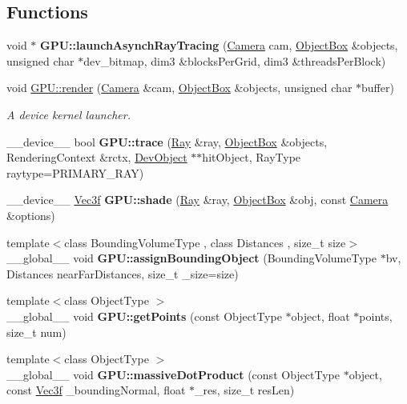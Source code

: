 \subsection*{Functions}
\begin{DoxyCompactItemize}
\item 
void $\ast$ {\bfseries G\+P\+U\+::launch\+Asynch\+Ray\+Tracing} (\hyperlink{struct_camera}{Camera} cam, \hyperlink{class_object_box}{Object\+Box} \&objects, unsigned char $\ast$dev\+\_\+bitmap, dim3 \&blocks\+Per\+Grid, dim3 \&threads\+Per\+Block)
\item 
void \hyperlink{group__rendering_gadd1c99922e3b5c249fac22f8946b5e57}{G\+P\+U\+::render} (\hyperlink{struct_camera}{Camera} \&cam, \hyperlink{class_object_box}{Object\+Box} \&objects, unsigned char $\ast$buffer)
\begin{DoxyCompactList}\small\item\em A device kernel launcher. \end{DoxyCompactList}\item 
\+\_\+\+\_\+device\+\_\+\+\_\+ bool {\bfseries G\+P\+U\+::trace} (\hyperlink{class_ray}{Ray} \&ray, \hyperlink{class_object_box}{Object\+Box} \&objects, Rendering\+Context \&rctx, \hyperlink{class_dev_object}{Dev\+Object} $\ast$$\ast$hit\+Object, Ray\+Type raytype=P\+R\+I\+M\+A\+R\+Y\+\_\+\+R\+AY)
\item 
\+\_\+\+\_\+device\+\_\+\+\_\+ \hyperlink{class_vec3}{Vec3f} {\bfseries G\+P\+U\+::shade} (\hyperlink{class_ray}{Ray} \&ray, \hyperlink{class_object_box}{Object\+Box} \&obj, const \hyperlink{struct_camera}{Camera} \&options)
\item 
{\footnotesize template$<$class Bounding\+Volume\+Type , class Distances , size\+\_\+t size$>$ }\\\+\_\+\+\_\+global\+\_\+\+\_\+ void {\bfseries G\+P\+U\+::assign\+Bounding\+Object} (Bounding\+Volume\+Type $\ast$bv, Distances near\+Far\+Distances, size\+\_\+t \+\_\+size=size)\hypertarget{rendering_8cuh_a81d1631d860fe534326c9dcb30d1c2ec}{}\label{rendering_8cuh_a81d1631d860fe534326c9dcb30d1c2ec}

\item 
{\footnotesize template$<$class Object\+Type $>$ }\\\+\_\+\+\_\+global\+\_\+\+\_\+ void {\bfseries G\+P\+U\+::get\+Points} (const Object\+Type $\ast$object, float $\ast$points, size\+\_\+t num)\hypertarget{rendering_8cuh_ae20d656e78c761dae4199fd9e7a547be}{}\label{rendering_8cuh_ae20d656e78c761dae4199fd9e7a547be}

\item 
{\footnotesize template$<$class Object\+Type $>$ }\\\+\_\+\+\_\+global\+\_\+\+\_\+ void {\bfseries G\+P\+U\+::massive\+Dot\+Product} (const Object\+Type $\ast$object, const \hyperlink{class_vec3}{Vec3f} \+\_\+bounding\+Normal, float $\ast$\+\_\+res, size\+\_\+t res\+Len)\hypertarget{rendering_8cuh_a25d7b057a4233ea0016c486e951f7946}{}\label{rendering_8cuh_a25d7b057a4233ea0016c486e951f7946}


\end{DoxyCompactItemize}
